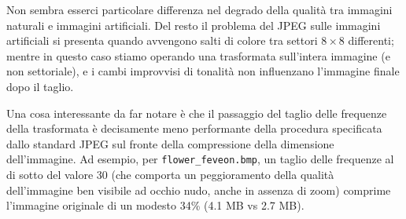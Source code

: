 \documentclass[11pt,a4paper]{scrartcl}
\begin{document}
\clearpage

Non sembra esserci particolare differenza nel degrado della qualità tra immagini naturali e immagini artificiali. Del resto il problema del JPEG sulle immagini artificiali si presenta quando avvengono salti di colore tra settori $8 \times 8$ differenti; mentre in questo caso stiamo operando una trasformata sull'intera immagine (e non settoriale), e i cambi improvvisi di tonalità non influenzano l'immagine finale dopo il taglio.

Una cosa interessante da far notare è che il passaggio del taglio delle frequenze della trasformata è decisamente meno performante della procedura specificata dallo standard JPEG sul fronte della compressione della dimensione dell'immagine. Ad esempio, per \texttt{flower\_feveon.bmp}, un taglio delle frequenze al di sotto del valore 30 (che comporta un peggioramento della qualità dell'immagine ben visibile ad occhio nudo, anche in assenza di zoom) comprime l'immagine originale di un modesto 34\% (4.1 MB vs 2.7 MB).
\end{document}
